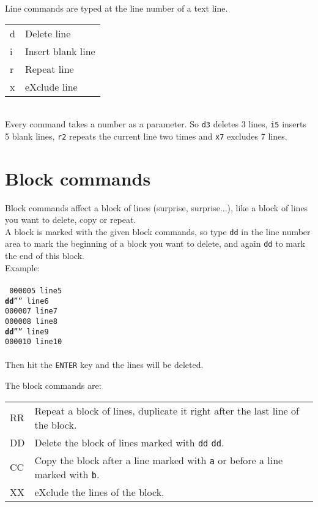\documentclass{report}
\begin{document}
Line commands are typed at the line number of a text line. \\ 

\begin{tabular}{l l}
d & Delete line \\
i & Insert blank line \\
r & Repeat line \\
x & eXclude line \\
\end{tabular} \\

Every command takes a number as a parameter.
So \texttt{d3} deletes 3 lines, \texttt{i5} inserts 5 blank lines,
\texttt{r2} repeats the current line two times and \texttt{x7} excludes 7 lines.

\chapter{Block commands}

Block commands affect a block of lines (surprise, surprise...), like a block
of lines you want to delete, copy or repeat. \\

A block is marked with the given block commands, so type  \texttt{dd} in the
line number area to mark the beginning of a block you want to delete, and
again \texttt{dd} to mark the end of this block. \\

Example: \\ \\
\texttt{
000005 line5 \\
\textbf{dd}'''' line6 \\
000007 line7 \\
000008 line8 \\
\textbf{dd}'''' line9 \\
000010 line10 \\
} \\
\break
Then hit the \texttt{ENTER} key and the lines will be deleted.

\break
The block commands are: \\

\begin{tabular}{l l}
RR & Repeat a block of lines, duplicate it right after the last line of the block. \\
DD & Delete the block of lines marked with \texttt{dd}  \texttt{dd}. \\
CC & Copy the block after a line marked with \texttt{a} or before a line marked
     with \texttt{b}. \\
XX & eXclude the lines of the block. \\
\end{tabular} \\
\end{document}

